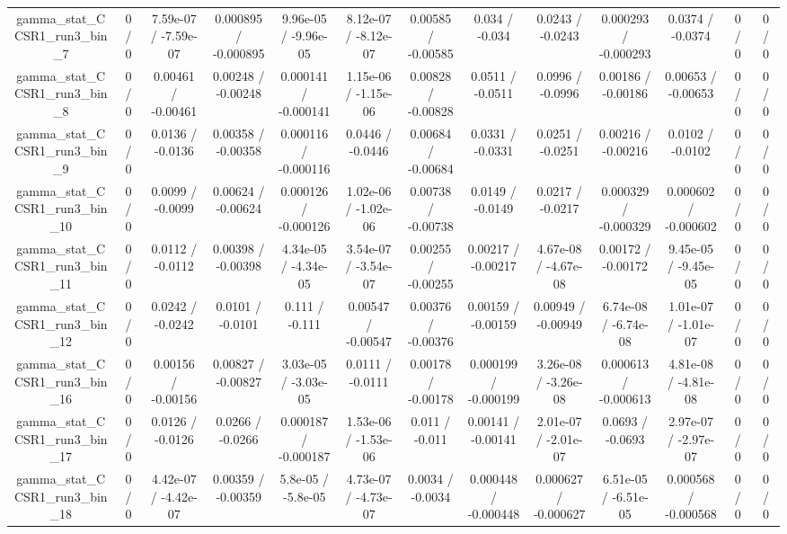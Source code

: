 \documentclass[10pt]{article}
\begin{document}
\begin{table}[htbp]
\begin{center}
\begin{tabular}{|c|c|c|c|c|c|c|c|c|c|c|c|c|}
  gamma_stat_CCSR1_run3_bin_7 & 0 / 0 & 7.59e-07 / -7.59e-07 & 0.000895 / -0.000895 & 9.96e-05 / -9.96e-05 & 8.12e-07 / -8.12e-07 & 0.00585 / -0.00585 & 0.034 / -0.034 & 0.0243 / -0.0243 & 0.000293 / -0.000293 & 0.0374 / -0.0374 & 0 / 0 & 0 / 0 \\ 
  gamma_stat_CCSR1_run3_bin_8 & 0 / 0 & 0.00461 / -0.00461 & 0.00248 / -0.00248 & 0.000141 / -0.000141 & 1.15e-06 / -1.15e-06 & 0.00828 / -0.00828 & 0.0511 / -0.0511 & 0.0996 / -0.0996 & 0.00186 / -0.00186 & 0.00653 / -0.00653 & 0 / 0 & 0 / 0 \\ 
  gamma_stat_CCSR1_run3_bin_9 & 0 / 0 & 0.0136 / -0.0136 & 0.00358 / -0.00358 & 0.000116 / -0.000116 & 0.0446 / -0.0446 & 0.00684 / -0.00684 & 0.0331 / -0.0331 & 0.0251 / -0.0251 & 0.00216 / -0.00216 & 0.0102 / -0.0102 & 0 / 0 & 0 / 0 \\ 
  gamma_stat_CCSR1_run3_bin_10 & 0 / 0 & 0.0099 / -0.0099 & 0.00624 / -0.00624 & 0.000126 / -0.000126 & 1.02e-06 / -1.02e-06 & 0.00738 / -0.00738 & 0.0149 / -0.0149 & 0.0217 / -0.0217 & 0.000329 / -0.000329 & 0.000602 / -0.000602 & 0 / 0 & 0 / 0 \\ 
  gamma_stat_CCSR1_run3_bin_11 & 0 / 0 & 0.0112 / -0.0112 & 0.00398 / -0.00398 & 4.34e-05 / -4.34e-05 & 3.54e-07 / -3.54e-07 & 0.00255 / -0.00255 & 0.00217 / -0.00217 & 4.67e-08 / -4.67e-08 & 0.00172 / -0.00172 & 9.45e-05 / -9.45e-05 & 0 / 0 & 0 / 0 \\ 
  gamma_stat_CCSR1_run3_bin_12 & 0 / 0 & 0.0242 / -0.0242 & 0.0101 / -0.0101 & 0.111 / -0.111 & 0.00547 / -0.00547 & 0.00376 / -0.00376 & 0.00159 / -0.00159 & 0.00949 / -0.00949 & 6.74e-08 / -6.74e-08 & 1.01e-07 / -1.01e-07 & 0 / 0 & 0 / 0 \\ 
  gamma_stat_CCSR1_run3_bin_16 & 0 / 0 & 0.00156 / -0.00156 & 0.00827 / -0.00827 & 3.03e-05 / -3.03e-05 & 0.0111 / -0.0111 & 0.00178 / -0.00178 & 0.000199 / -0.000199 & 3.26e-08 / -3.26e-08 & 0.000613 / -0.000613 & 4.81e-08 / -4.81e-08 & 0 / 0 & 0 / 0 \\ 
  gamma_stat_CCSR1_run3_bin_17 & 0 / 0 & 0.0126 / -0.0126 & 0.0266 / -0.0266 & 0.000187 / -0.000187 & 1.53e-06 / -1.53e-06 & 0.011 / -0.011 & 0.00141 / -0.00141 & 2.01e-07 / -2.01e-07 & 0.0693 / -0.0693 & 2.97e-07 / -2.97e-07 & 0 / 0 & 0 / 0 \\ 
  gamma_stat_CCSR1_run3_bin_18 & 0 / 0 & 4.42e-07 / -4.42e-07 & 0.00359 / -0.00359 & 5.8e-05 / -5.8e-05 & 4.73e-07 / -4.73e-07 & 0.0034 / -0.0034 & 0.000448 / -0.000448 & 0.000627 / -0.000627 & 6.51e-05 / -6.51e-05 & 0.000568 / -0.000568 & 0 / 0 & 0 / 0 \\ 

\end{tabular}
\end{center}
\end{table}
\end{document}
